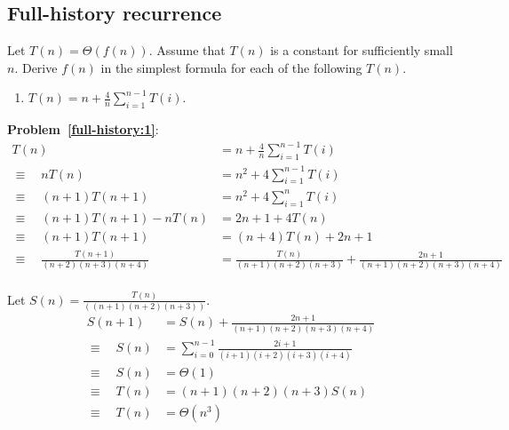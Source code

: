 \subsection{Full-history recurrence}
\begin{Exercise}
Let $T(n) = \Theta(f(n))$. Assume that $T(n)$ is a constant for sufficiently small $n$. Derive $f(n)$ in the simplest formula for each of the following $T(n)$.
\begin{enumerate}
\item $T(n) = n + \frac{4}{n} \sum_{i=1}^{n-1} T(i)$. \label{full-history:1} 
\end{enumerate}
\end{Exercise}
\begin{Answer}

{\bf Problem~\ref{full-history:1}}: 
\begin{align*}
T(n) & = n + \frac{4}{n} \sum_{i=1}^{n-1} T(i) \\
\equiv \quad nT(n) &= n^2 + 4\sum_{i=1}^{n-1} T(i) \\
\equiv \quad (n+1)T(n+1) &= n^2 + 4\sum_{i=1}^{n} T(i) \\
\equiv \quad (n+1)T(n+1) - nT(n) &= 2n + 1 + 4T(n) \\
\equiv \quad (n+1)T(n+1) &= (n+4)T(n) + 2n + 1 \\
\equiv \quad \frac{T(n+1)}{(n+2)(n+3)(n+4)} &= \frac{T(n)}{(n+1)(n+2)(n+3)} + \frac{2n+1}{(n+1)(n+2)(n+3)(n+4)} \\
\end{align*}

Let $S(n) = \frac{T(n)}{((n+1)(n+2)(n+3))}$.
\begin{align*}
S(n+1) & = S(n) + \frac{2n+1}{(n+1)(n+2)(n+3)(n+4)} \\
\equiv \quad S(n) &= \sum_{i=0}^{n-1} \frac{2i+1}{(i+1)(i+2)(i+3)(i+4)}\\
\equiv \quad S(n) &= \Theta(1) \\
\equiv \quad T(n) &= (n+1)(n+2)(n+3)S(n) \\
\equiv \quad T(n) &= \Theta(n^3) \\
\end{align*}
\end{Answer}


